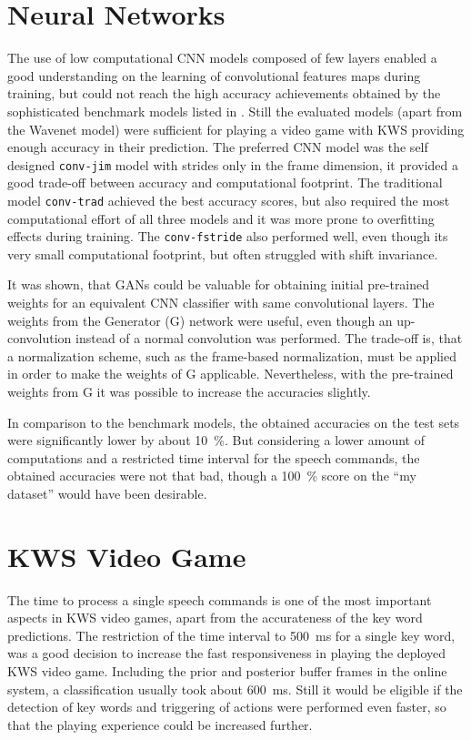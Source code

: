 \section{Neural Networks}
\thesisStateReady
The use of low computational CNN models composed of few layers enabled a good understanding on the learning of convolutional features maps during training, but could not reach the high accuracy achievements obtained by the sophisticated  benchmark models listed in . 
Still the evaluated models (apart from the Wavenet model) were sufficient for playing a video game with KWS providing enough accuracy in their prediction.
The preferred CNN model was the self designed \texttt{conv-jim} model with strides only in the frame dimension, it provided a good trade-off between accuracy and computational footprint.
The traditional model \texttt{conv-trad} achieved the best accuracy scores, but also required the most computational effort of all three models and it was more prone to overfitting effects during training.
The \texttt{conv-fstride} also performed well, even though its very small computational footprint, but often struggled with shift invariance.

It was shown, that GANs could be valuable for obtaining initial pre-trained weights for an equivalent CNN classifier with same convolutional layers.
The weights from the Generator (G) network were useful, even though an up-convolution instead of a normal convolution was performed.
The trade-off is, that a normalization scheme, such as the frame-based normalization, must be applied in order to make the weights of G applicable.
Nevertheless, with the pre-trained weights from G it was possible to increase the accuracies slightly.

In comparison to the benchmark models, the obtained accuracies on the test sets were significantly lower by about \SI{10}{\percent}.
But considering a lower amount of computations and a restricted time interval for the speech commands, the obtained accuracies were not that bad, though a \SI{100}{\percent} score on the \enquote{my dataset} would have been desirable.



\section{KWS Video Game}
\thesisStateReady
The time to process a single speech commands is one of the most important aspects in KWS video games, apart from the accurateness of the key word predictions.
The restriction of the time interval to \SI{500}{\milli\second} for a single key word, was a good decision to increase the fast responsiveness in playing the deployed KWS video game.
Including the prior and posterior buffer frames in the online system, a classification usually took about \SI{600}{\milli\second}.
Still it would be eligible if the detection of key words and triggering of actions were performed even faster, so that the playing experience could be increased further.

